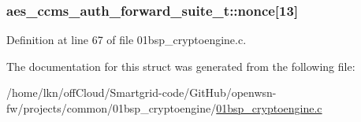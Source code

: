 \subsubsection[{\texorpdfstring{nonce}{nonce}}]{ aes\+\_\+ccms\+\_\+auth\+\_\+forward\+\_\+suite\+\_\+t\+::nonce\mbox{[}13\mbox{]}}\hypertarget{structaes__ccms__auth__forward__suite__t_aad0f471a708074e5f342a2c31bdd879f}{}\label{structaes__ccms__auth__forward__suite__t_aad0f471a708074e5f342a2c31bdd879f}


Definition at line 67 of file 01bsp\+\_\+cryptoengine.\+c.



The documentation for this struct was generated from the following file\+:\begin{DoxyCompactItemize}
\item 
/home/lkn/off\+Cloud/\+Smartgrid-\/code/\+Git\+Hub/openwsn-\/fw/projects/common/01bsp\+\_\+cryptoengine/\hyperlink{01bsp__cryptoengine_8c}{01bsp\+\_\+cryptoengine.\+c}\end{DoxyCompactItemize}
